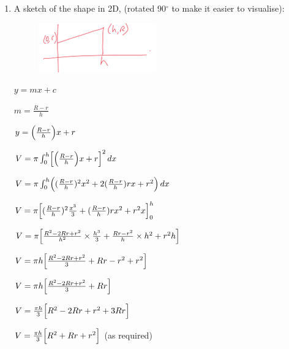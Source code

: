 \documentclass[../main.tex]{subfiles}
\begin{document}
\begin{spacing}{1.5}
\begin{enumerate}[itemsep=0.7cm]
    \item 
    A sketch of the shape in 2D, (rotated 90$^\circ$ to make it easier to visualise):

    \begin{figure}[h!]
        \centering
        \includegraphics{images/volrev20.png}
    \end{figure}

    $y=mx+c$

    $m=\frac{R-r}{h}$

    $y=\Bigl(\frac{R-r}{h}\Bigr)x+r$

    $V=\pi \int_0^h \Bigl[\Bigl(\frac{R-r}{h}\Bigr)x+r\Bigr]^2\,dx$

    $V=\pi \int_0^h \Bigl((\frac{R-r}{h})^2x^2 +2(\frac{R-r}{h})rx+r^2\Bigr)\, dx$

    $V=\pi \Bigl[(\frac{R-r}{h})^2 \frac{x^3}{3}+(\frac{R-r}{h})rx^2+r^2x\Bigr]_0^h$

    $V=\pi \Bigl[\frac{R^2-2Rr+r^2}{h^2}\times \frac{h^3}{3}+\frac{Rr-r^2}{h}\times h^2 +r^2h\Bigr]$

    $V=\pi h\Bigl[\frac{R^2-2Rr+r^2}{3}+Rr-r^2+r^2\Bigr]$

    $V=\pi h\Bigl[\frac{R^2-2Rr+r^2}{3}+Rr\Bigr]$

    $V=\frac{\pi h}{3}\Bigl[R^2-2Rr+r^2+3Rr\Bigr]$

    $V=\frac{\pi h}{3}\Bigl[R^2+Rr+r^2\Bigr]$ (as required)

\end{enumerate}


\pagebreak
\end{spacing}
\end{document}
